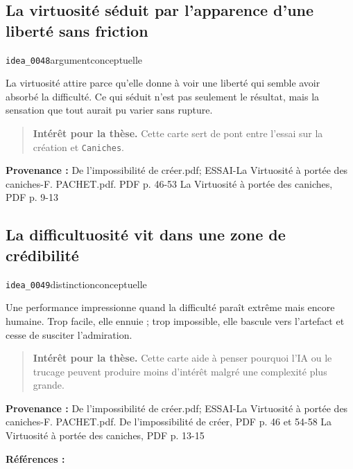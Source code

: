 \documentclass[10pt,a4paper]{article}
\begin{document}
\subsection{La virtuosité séduit par l'apparence d'une liberté sans friction}
{\small\color{metadata} \texttt{idea\_0048}\quad\textbullet\quad argument\quad\textbullet\quad conceptuelle\par}

La virtuosité attire parce qu'elle donne à voir une liberté qui semble avoir absorbé la difficulté. Ce qui séduit n'est pas seulement le résultat, mais la sensation que tout aurait pu varier sans rupture.

\begin{quote}
\textbf{Intérêt pour la thèse.} Cette carte sert de pont entre l'essai sur la création et \texttt{Caniches}.
\end{quote}
{\footnotesize\color{metadata}\textbf{Provenance :} De l'impossibilité de créer.pdf; ESSAI-La Virtuosité à portée des caniches-F. PACHET.pdf. PDF p. 46-53 La Virtuosité à portée des caniches, PDF p. 9-13\par}

\subsection{La difficultuosité vit dans une zone de crédibilité}
{\small\color{metadata} \texttt{idea\_0049}\quad\textbullet\quad distinction\quad\textbullet\quad conceptuelle\par}

Une performance impressionne quand la difficulté paraît extrême mais encore humaine. Trop facile, elle ennuie ; trop impossible, elle bascule vers l'artefact et cesse de susciter l'admiration.

\begin{quote}
\textbf{Intérêt pour la thèse.} Cette carte aide à penser pourquoi l'IA ou le trucage peuvent produire moins d'intérêt malgré une complexité plus grande.
\end{quote}
{\footnotesize\color{metadata}\textbf{Provenance :} De l'impossibilité de créer.pdf; ESSAI-La Virtuosité à portée des caniches-F. PACHET.pdf. De l'impossibilité de créer, PDF p. 46 et 54-58 La Virtuosité à portée des caniches, PDF p. 13-15\par}
{\footnotesize\color{metadata}\textbf{Références :} \parencite{pachet2026impossibilite,pachet2027virtuosite}\par}
\end{document}
